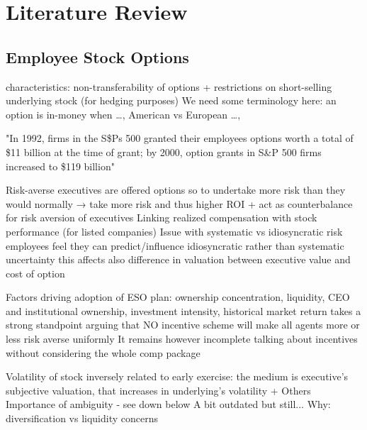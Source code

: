 \section{Literature Review}

\subsection{Employee Stock Options} %

    characteristics: non-transferability of options + restrictions on short-selling underlying stock (for hedging purposes)
    We need some terminology here: an option is in-money when \dots, American vs European \dots, 

    "In 1992, firms in the S\$Ps 500 granted their employees options worth a total of \$11 billion at the time of grant; by 2000, option grants in S\&P 500 firms increased to \$119 billion" \cite{hall2003trouble}

    Risk-averse executives are offered options so to undertake more risk than they would normally → take more risk and thus higher ROI + act as counterbalance for risk aversion of executives
    Linking realized compensation with stock performance (for listed companies)
    Issue with systematic vs idiosyncratic risk  \cite{armstrong2012executive} \cite{heron2017stock}
        employees feel they can predict/influence idiosyncratic rather than systematic uncertainty
        this affects also difference in valuation between executive value and cost of option \cite{meulbroek2001efficiency}

    Factors driving adoption of ESO plan: ownership concentration, liquidity, CEO and institutional ownership, investment intensity, historical market return \cite{pasternack2002factors}
    \cite{ross2004compensation} takes a strong standpoint arguing that NO incentive scheme will make all agents more or less risk averse uniformly
    It remains however incomplete talking about incentives without considering the whole comp package

    Volatility of stock inversely related to early exercise: the medium is executive's subjective valuation, that increases in underlying's volatility \cite{heron2017stock} \cite{izhakian2017risk} + Others
    Importance of ambiguity - see down below 
    A bit outdated but still... \cite{huddart1996employee}
    Why: diversification vs liquidity concerns \cite{murphy2019employees}

